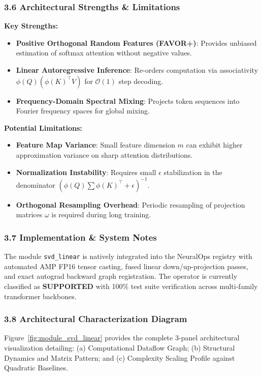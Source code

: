 \subsubsection*{3.6 Architectural Strengths \& Limitations}
\textbf{Key Strengths:}
\begin{itemize}
    \item \textbf{Positive Orthogonal Random Features (FAVOR+)}: Provides unbiased estimation of softmax attention without negative values.
    \item \textbf{Linear Autoregressive Inference}: Re-orders computation via associativity $\phi(Q) (\phi(K)^\top V)$ for $\mathcal{O}(1)$ step decoding.
    \item \textbf{Frequency-Domain Spectral Mixing}: Projects token sequences into Fourier frequency spaces for global mixing.
\end{itemize}

\textbf{Potential Limitations:}
\begin{itemize}
    \item \textbf{Feature Map Variance}: Small feature dimension $m$ can exhibit higher approximation variance on sharp attention distributions.
    \item \textbf{Normalization Instability}: Requires small $\epsilon$ stabilization in the denominator $(\phi(Q) \sum \phi(K)^\top + \epsilon)^{-1}$.
    \item \textbf{Orthogonal Resampling Overhead}: Periodic resampling of projection matrices $\omega$ is required during long training.
\end{itemize}

\subsubsection*{3.7 Implementation \& System Notes}
The module \texttt{svd\_linear} is natively integrated into the NeuralOps registry with automated AMP FP16 tensor casting, fused linear down/up-projection passes, and exact autograd backward graph registration. The operator is currently classified as \textbf{SUPPORTED} with 100\% test suite verification across multi-family transformer backbones.

\subsubsection*{3.8 Architectural Characterization Diagram}
Figure~\ref{fig:module_svd_linear} provides the complete 3-panel architectural visualization detailing: (a) Computational Dataflow Graph; (b) Structural Dynamics and Matrix Pattern; and (c) Complexity Scaling Profile against Quadratic Baselines.

